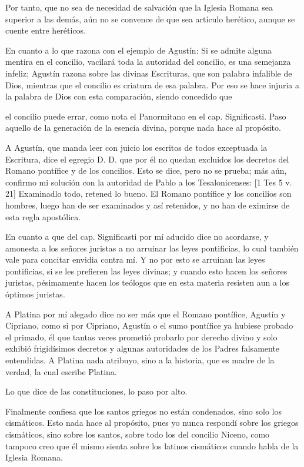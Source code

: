 Por tanto, que no sea de necesidad de salvación que la Iglesia Romana sea superior a las demás, aún no se convence de que sea artículo herético, aunque se cuente entre heréticos.

En cuanto a lo que razona con el ejemplo de Agustín: Si se admite alguna mentira en el concilio, vacilará toda la autoridad del concilio, es una semejanza infeliz; Agustín razona sobre las divinas Escrituras, que son palabra infalible de Dios, mientras que el concilio es criatura de esa palabra. Por eso se hace injuria a la palabra de Dios con esta comparación, siendo concedido que

el concilio puede errar, como nota el Panormitano en el cap. Significasti. Paso aquello de la generación de la esencia divina, porque nada hace al propósito.

A Agustín, que manda leer con juicio los escritos de todos exceptuada la Escritura, dice el egregio D. D. que por él no quedan excluidos los decretos del Romano pontífice y de los concilios. Esto se dice, pero no se prueba; más aún, confirmo mi solución \marginpar{\small[289]} con la autoridad de Pablo a los Tesalonicenses: [1 Tes 5 v. 21] Examinadlo todo, retened lo bueno. El Romano pontífice y los concilios son hombres, luego han de ser examinados y así retenidos, y no han de eximirse de esta regla apostólica.

En cuanto a que del cap. Significasti por mí aducido dice no acordarse, y amonesta a los señores juristas a no arruinar las leyes pontificias, lo cual también vale para concitar envidia contra mí. Y no por esto se arruinan las leyes pontificias, si se les prefieren las leyes divinas; y cuando esto hacen los señores juristas, pésimamente hacen los teólogos que en esta materia resisten aun a los óptimos juristas.

A Platina por mí alegado dice no ser más que el Romano pontífice, Agustín y Cipriano, como si por Cipriano, Agustín o el sumo pontífice ya hubiese probado el primado, él que tantas veces prometió probarlo por derecho divino y solo exhibió frigidísimos decretos y algunas autoridades de los Padres falsamente entendidas. A Platina nada atribuyo, sino a la historia, que es madre de la verdad, la cual escribe Platina.

Lo que dice de las constituciones, lo paso por alto.

Finalmente confiesa que los santos griegos no están condenados, sino solo los cismáticos. Esto nada hace al propósito, pues yo nunca respondí sobre los griegos cismáticos, sino sobre los santos, sobre todo los del concilio Niceno, como tampoco creo que él mismo sienta sobre los latinos cismáticos cuando habla de la Iglesia Romana.

